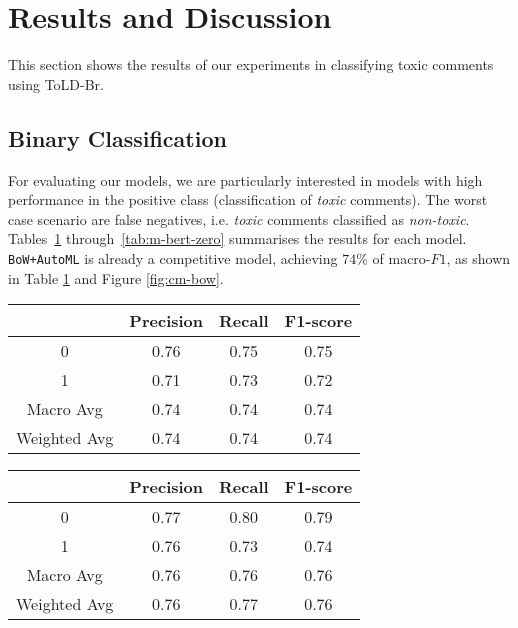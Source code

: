 \documentclass[11pt,a4paper]{article}
\begin{document}
\section{Results and Discussion} \label{sec:results}
This section shows the results of our experiments in classifying toxic comments using ToLD-Br.



\subsection{Binary Classification}

For evaluating our models, we are particularly interested in models with high performance in the positive class (classification of \textit{toxic} comments). The worst case scenario are false negatives, i.e. \textit{toxic} comments classified as \textit{non-toxic}. Tables~\ref{tab:bow+automl} through~\ref{tab:m-bert-zero} summarises the results for each model. \texttt{BoW+AutoML} is already a competitive model, achieving $74$\% of macro-$F1$, as shown in Table \ref{tab:bow+automl} and Figure \ref{fig:cm-bow}.

\begin{table}[!ht]
\centering
        \begin{tabular}{@{}cccc@{}}\toprule
                     & Precision & Recall & F1-score \\ \midrule
        0            & 0.76      & 0.75   & 0.75     \\
        1            & 0.71      & 0.73   & 0.72     \\ \hline
        Macro Avg    & 0.74      & 0.74   & 0.74     \\
        Weighted Avg & 0.74      & 0.74   & 0.74     \\ \bottomrule
        \end{tabular}
        \label{tab:bow+automl}
\end{table}

\begin{table}[!ht]
\centering
        \begin{tabular}{@{}cccc@{}}\toprule
                     & Precision & Recall & F1-score \\ \midrule
        0            & 0.77      & 0.80   & 0.79     \\
        1            & 0.76      & 0.73   & 0.74     \\ \hline
        Macro Avg    & 0.76      & 0.76   & 0.76     \\
        Weighted Avg & 0.76      & 0.77   & 0.76     \\ \bottomrule
        \end{tabular}
        \label{tab:br-bert}
\end{table}
\end{document}
